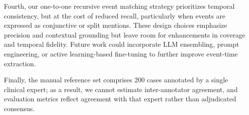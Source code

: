 Fourth, our one-to-one recursive event matching strategy prioritizes temporal consistency, but at the cost of reduced recall, particularly when events are expressed as conjunctive or split mentions. These design choices emphasize precision and contextual grounding but leave room for enhancements in coverage and temporal fidelity. Future work could incorporate LLM ensembling, prompt engineering, or active learning-based fine-tuning to further improve event-time extraction.

Finally, the manual reference set comprises 200 cases annotated by a single clinical expert; as a result, we cannot estimate inter-annotator agreement, and evaluation metrics reflect agreement with that expert rather than adjudicated consensus.
